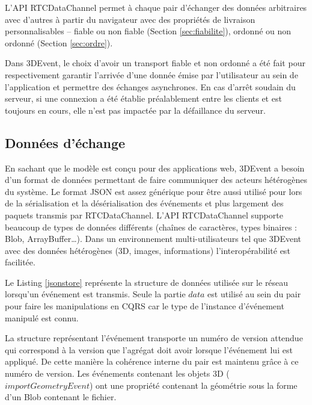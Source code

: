 L'API RTCDataChannel permet à chaque pair d'échanger des données arbitraires 
avec d'autres à partir du navigateur avec des propriétés de livraison 
personnalisables -- fiable ou non fiable (Section \ref{sec:fiabilite}), ordonné ou non 
ordonné (Section \ref{sec:ordre}). 

Dans 3DEvent, le choix d'avoir un transport 
fiable et non ordonné a été fait pour respectivement 
garantir l'arrivée d'une donnée émise par l'utilisateur au sein de l'application et 
permettre des échanges asynchrones.
En cas d'arrêt soudain du serveur, si une connexion a été établie préalablement 
entre les clients et est toujours en cours, elle n'est pas impactée par la défaillance 
du serveur.

\subsection{Données d'échange}
En sachant que le modèle est conçu pour des applications web, 3DEvent a besoin 
d'un format de données permettant de faire communiquer des acteurs hétérogènes 
du système.
Le format \gls{JSON} est assez générique pour être aussi utilisé pour lors de la 
sérialisation et la désérialisation des 
événements et plus largement des paquets transmis par RTCDataChannel. 
L'\acrshort{API} RTCDataChannel supporte beaucoup de types de données 
différents (chaînes de caractères, types binaires : Blob, ArrayBuffer\dots). Dans 
un environnement multi-utilisateurs tel que 3DEvent avec des données 
hétérogènes (3D, images, 
informations) l'interopérabilité est facilitée.

Le Listing  \ref{jsonstore} représente la structure de données utilisée sur le réseau 
lorsqu'un événement est transmis. Seule la partie $data$ est utilisé au sein du pair 
pour faire les manipulations en \gls{CQRS} car le type de l'instance d'événement 
manipulé est connu. 

La structure représentant l'événement transporte un numéro de version \og 
attendue\fg{} 
qui correspond à la version que l'agrégat doit avoir lorsque l'événement lui est 
appliqué. De cette manière la cohérence interne du pair est maintenu grâce à ce 
numéro de version.
Les événements contenant les objets 3D ($importGeometryEvent$) ont une 
propriété contenant la géométrie sous la forme d'un Blob contenant le fichier. 
\\



